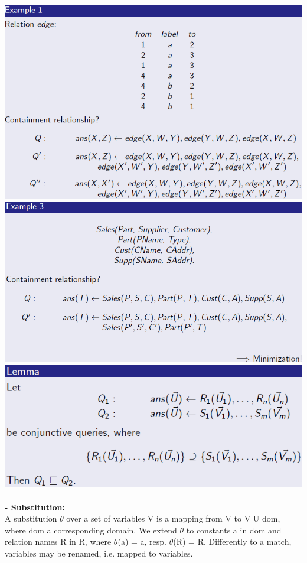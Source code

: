 \documentclass{article}
\begin{document}
\includegraphics[scale=0.5]{58.png}
\includegraphics[scale=0.5]{59.png}\\
\includegraphics[scale=0.6]{60.png}\\\\
\textbf{- Substitution: }\\
A substitution $\theta$ over a set of variables V is a mapping from V to V U dom,
where dom a corresponding domain. We extend $\theta$ to constants a in dom and relation names R in R, where $\theta$(a) = a, resp. $\theta$(R) = R. Differently to a match, variables may be renamed, i.e. mapped to variables.\\
\end{document}
